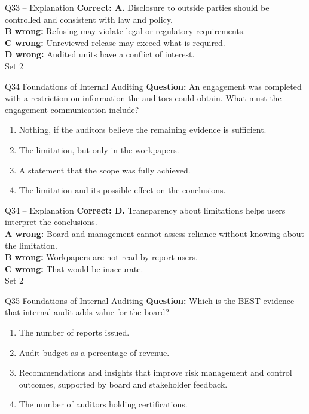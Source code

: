 \documentclass[aspectratio=169,10pt]{beamer}
\begin{document}
\begin{frame}[t]{Q33 -- Explanation}
	\footnotesize
	\textbf{Correct: A.} Disclosure to outside parties should be controlled and consistent with law and policy. \\[5pt]
\textbf{B wrong:} Refusing may violate legal or regulatory requirements. \\[3pt]
\textbf{C wrong:} Unreviewed release may exceed what is required. \\[3pt]
\textbf{D wrong:} Audited units have a conflict of interest. \\[3pt]
	\vfill {\tiny Set 2}
\end{frame}

\begin{frame}[t]{Q34 \hfill {\scriptsize Foundations of Internal Auditing}}
	\small
	\textbf{Question:} An engagement was completed with a restriction on information the auditors could obtain. What must the engagement communication include?
	\begin{enumerate}[label=\Alph*.,itemsep=1pt,topsep=3pt]
			\item Nothing, if the auditors believe the remaining evidence is sufficient.
			\item The limitation, but only in the workpapers.
			\item A statement that the scope was fully achieved.
			\item The limitation and its possible effect on the conclusions.
	\end{enumerate}
\end{frame}

\begin{frame}[t]{Q34 -- Explanation}
	\footnotesize
	\textbf{Correct: D.} Transparency about limitations helps users interpret the conclusions. \\[5pt]
\textbf{A wrong:} Board and management cannot assess reliance without knowing about the limitation. \\[3pt]
\textbf{B wrong:} Workpapers are not read by report users. \\[3pt]
\textbf{C wrong:} That would be inaccurate. \\[3pt]
	\vfill {\tiny Set 2}
\end{frame}

\begin{frame}[t]{Q35 \hfill {\scriptsize Foundations of Internal Auditing}}
	\small
	\textbf{Question:} Which is the BEST evidence that internal audit adds value for the board?
	\begin{enumerate}[label=\Alph*.,itemsep=1pt,topsep=3pt]
			\item The number of reports issued.
			\item Audit budget as a percentage of revenue.
			\item Recommendations and insights that improve risk management and control outcomes, supported by board and stakeholder feedback.
			\item The number of auditors holding certifications.
	\end{enumerate}
\end{frame}
\end{document}
